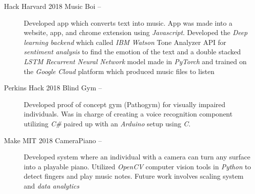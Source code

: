 \documentclass[letterpaper, 8pt]{extarticle}
\makeatletter
\newcommand{\resitem}[1]{\item #1 \vspace{-2pt}}
\newcommand{\resheading}[1]{{\large \colorbox{mygrey}{\begin{minipage}{0.99\textwidth}{\textbf{#1 \vphantom{p\^{E}}}}\end{minipage}}}}
\newcommand{\ressubheading}[4]{
\begin{tabular*}{7.40in}{l@{\extracolsep{\fill}}r}
		\textbf{#1} & #2 \\
		\textit{#3} & \textit{#4} \\
\end{tabular*}\vspace{-6pt}}
\makeatother
\begin{document}
\begin{description}
\item[Hack Harvard 2018 Music Boi --] Developed app which converts text into music. App was made into a website, app, and chrome extension using \emph{Javascript}. Developed the \emph{Deep learning backend} which called \emph{IBM Watson} Tone Analyzer API for \emph{sentiment analysis} to find the emotion of the text and a double stacked \emph{LSTM Recurrent Neural Network} model made in \emph{PyTorch} and trained on the \emph{Google Cloud} platform which produced music files to listen

\item[Perkins Hack 2018 Blind Gym --]  Developed proof of concept gym (Pathogym) for visually impaired individuals. Was in charge of creating a voice recognition component utilizing \emph{C\#} paired up with an \emph{Arduino} setup using \emph{C}.

\item[Make MIT 2018 CameraPiano --] Developed system where an individual with a camera can turn any surface into a playable piano. Utilized \emph{OpenCV} computer vision tools in \emph{Python} to detect fingers and play music notes. Future work involves scaling system and \emph{data analytics}

\end{description}



\begin{comment}
\resheading{Leadership Activities}
\begin{itemize}
    
    \item \ressubheading{Machine Intelligence Community}{Boston, MA}{Active Member/Speaker}{September 2018 - Present}
    \begin{itemize}
        \resitem{Contribute latest news regarding research in Artificial Intelligence to club.}
        \resitem{Gave talk, discussion, and demo on the \textit{Neural Ordinary Differential Equations} paper and research by Chen et.al}
    \end{itemize}
\end{itemize}
\end{comment}



\begin{comment}
\resheading{Interests \& Activities}
Society of Asian Scientists and Engineers (SASE), IEEE Eta Kappu Nu ECE Honor Member of Society, Machine Intelligence Community (MIC Club), Mentoring, Tutoring, Travelling the world and experiencing new cultures, Learning Japanese \& Korean
\end{comment}
\end{document}
